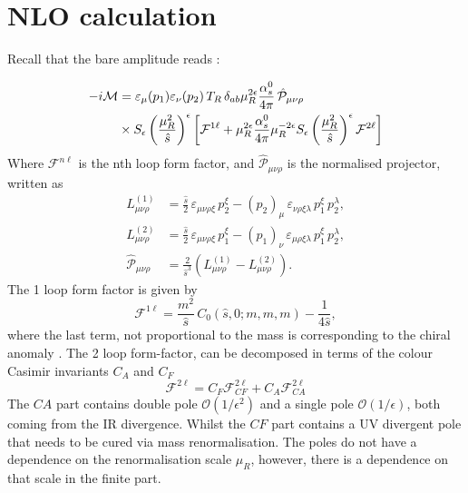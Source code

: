 \section{ NLO calculation }

Recall that the bare amplitude  reads :

\begin{align}
	-i \mathcal{M} &=  \varepsilon_\mu(p_1) \varepsilon_\nu(p_2)  \,T_R\, \delta_{ab}  \mu_R^{2\epsilon} \frac{\alpha_s^0}{4 \pi}\,  \hat{\mathcal P}_{\mu\nu\rho} \nonumber \\
	& \times S_{\epsilon} \left( \frac{\mu^2_R}{\hat s} \right) ^\epsilon \left[   \mathcal F ^{1 \ell} + \mu_R^{2\epsilon} \frac{\alpha_s^0}{4 \pi} \mu_R^{-2\epsilon} S_{\epsilon} \left( \frac{\mu^2_R}{\hat s} \right) ^\epsilon  \mathcal F ^{2 \ell}  \right]
\end{align}
Where $ \mathcal F^{n\ell}$ is the nth loop form factor, and $\hat{\mathcal P}_{\mu\nu\rho} $ is the normalised projector, written as
\begin{align}
	L^{(1)}_{\mu\nu\rho}  &=  \frac{\hat s}{2} \, \varepsilon_{\mu\nu\rho \xi} \, p_2^\xi -( p_2)_\mu\, \varepsilon_{\nu\rho \xi \lambda } \, p_1^\xi\, p_2 ^\lambda,  \nonumber \\
	L^{(2)}_{\mu\nu\rho}  &= \frac{\hat s}{2} \, \varepsilon_{\mu\nu\rho \xi} \, p_1^\xi -( p_1)_\nu\, \varepsilon_{\mu\rho \xi \lambda } \, p_1^\xi\, p_2 ^\lambda,  \nonumber \\
	\hat{\mathcal P}_{\mu\nu\rho}  &=  \frac{2}{\hat s^3} \left( 	L^{(1)}_{\mu\nu\rho} - 	L^{(2)}_{\mu\nu\rho}\right) .
\end{align}
The 1 loop form factor is given by
\begin{equation}
	\mathcal F ^{1 \ell}  = \frac{m^2}{\hat s} \, C_0(\hat s,0; m,m,m) - \frac{1}{4 \hat s},
\end{equation}
where the last term, not proportional to the mass is corresponding to  the chiral anomaly .
The 2 loop form-factor, can be decomposed in terms of the colour Casimir invariants $ C_A$ and $ C_F$
\begin{equation}
	\mathcal F ^{2 \ell}   = C_F \mathcal F_{CF} ^{2 \ell}  + C_A \mathcal F_{CA} ^{2 \ell}
\end{equation}
The $CA$ part contains double pole $ \mathcal O( 1/\epsilon^2) $  and a single pole $ \mathcal O( 1/\epsilon) $, both  coming from the IR divergence. Whilst the $CF$ part contains a UV divergent pole that needs to be cured via mass renormalisation. The poles do not have a dependence on the renormalisation scale $ \mu_R$, however, there is a dependence on that scale in the finite part.

